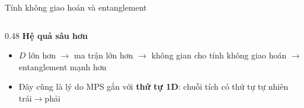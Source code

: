 \documentclass[aspectratio=169, 11pt]{beamer}
\begin{document}
\begin{frame}[shrink=3]{Tính không giao hoán và entanglement}
\begin{columns}[T]
\begin{column}{0.48\textwidth}
\vspace{6pt}
\textcolor{qamber}{\textbf{Hệ quả sâu hơn}}\\[3pt]
{\small
\begin{itemize}
  \item $D$ lớn hơn $\to$ ma trận lớn hơn $\to$ không gian cho tính không giao hoán $\to$ entanglement mạnh hơn
  \item Đây cũng là lý do MPS gắn với \textbf{thứ tự 1D}: chuỗi tích có thứ tự tự nhiên trái$\to$phải
\end{itemize}}

\end{column}
\end{columns}

\end{frame}

\end{document}
